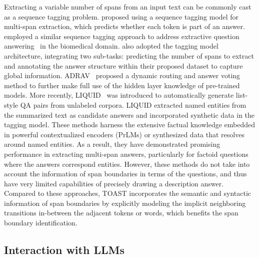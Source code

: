 Extracting a variable number of spans from an input text can be commonly cast as a sequence tagging problem.
\cite{segal2020simple} proposed using a sequence tagging model for multi-span extraction, which predicts whether each token is part of an answer. \cite{yoon2022} employed a similar sequence tagging approach to address extractive question answering~\citep{DBLP:journals/bmcbi/NaseemDKK22}  in the biomedical domain.
\cite{li2022multispanqa} also adopted the tagging model architecture, integrating two sub-tasks: predicting the number of spans to extract and annotating the answer structure within their proposed dataset to capture global information.
ADRAV~\citep{hu2023biomedical} proposed a dynamic routing and answer voting method to further make full use of the hidden layer knowledge of pre-trained models.
More recently, LIQUID~\citep{lee2023liquid} was introduced to  automatically generate list-style QA pairs from unlabeled corpora. LIQUID extracted named entities from the summarized text as candidate answers and incorporated synthetic data in the tagging model. 
These methods harness the extensive factual knowledge embedded in powerful contextualized encoders (PrLMs) or synthesized data that resolves around named entities. 
As a result, they have demonstrated promising performance in extracting  multi-span answers, particularly for factoid questions where the answers correspond entities.
However, these methods do not take into account the information of span boundaries in terms of the questions, and thus have very limited capabilities of precisely drawing a description answer. 
Compared to these approaches, TOAST incorporates the semantic and syntactic information of span boundaries by explicitly modeling the implicit neighboring transitions in-between the adjacent tokens or words, which benefits the span boundary identification.


\subsection{Interaction with LLMs}
